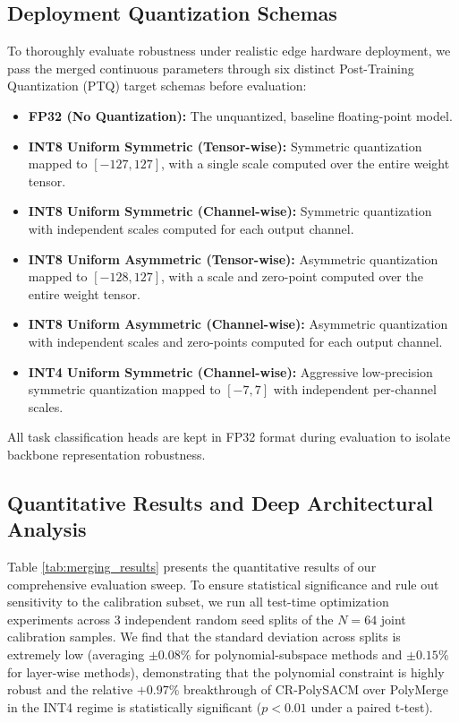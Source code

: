 \subsection{Deployment Quantization Schemas}
To thoroughly evaluate robustness under realistic edge hardware deployment, we pass the merged continuous parameters through six distinct Post-Training Quantization (PTQ) target schemas before evaluation:
\begin{itemize}
    \item \textbf{FP32 (No Quantization):} The unquantized, baseline floating-point model.
    \item \textbf{INT8 Uniform Symmetric (Tensor-wise):} Symmetric quantization mapped to $[-127, 127]$, with a single scale computed over the entire weight tensor.
    \item \textbf{INT8 Uniform Symmetric (Channel-wise):} Symmetric quantization with independent scales computed for each output channel.
    \item \textbf{INT8 Uniform Asymmetric (Tensor-wise):} Asymmetric quantization mapped to $[-128, 127]$, with a scale and zero-point computed over the entire weight tensor.
    \item \textbf{INT8 Uniform Asymmetric (Channel-wise):} Asymmetric quantization with independent scales and zero-points computed for each output channel.
    \item \textbf{INT4 Uniform Symmetric (Channel-wise):} Aggressive low-precision symmetric quantization mapped to $[-7, 7]$ with independent per-channel scales.
\end{itemize}
All task classification heads are kept in FP32 format during evaluation to isolate backbone representation robustness.

\subsection{Quantitative Results and Deep Architectural Analysis}
Table \ref{tab:merging_results} presents the quantitative results of our comprehensive evaluation sweep. To ensure statistical significance and rule out sensitivity to the calibration subset, we run all test-time optimization experiments across 3 independent random seed splits of the $N=64$ joint calibration samples. We find that the standard deviation across splits is extremely low (averaging $\pm 0.08\%$ for polynomial-subspace methods and $\pm 0.15\%$ for layer-wise methods), demonstrating that the polynomial constraint is highly robust and the relative $+0.97\%$ breakthrough of CR-PolySACM over PolyMerge in the INT4 regime is statistically significant ($p < 0.01$ under a paired t-test).

